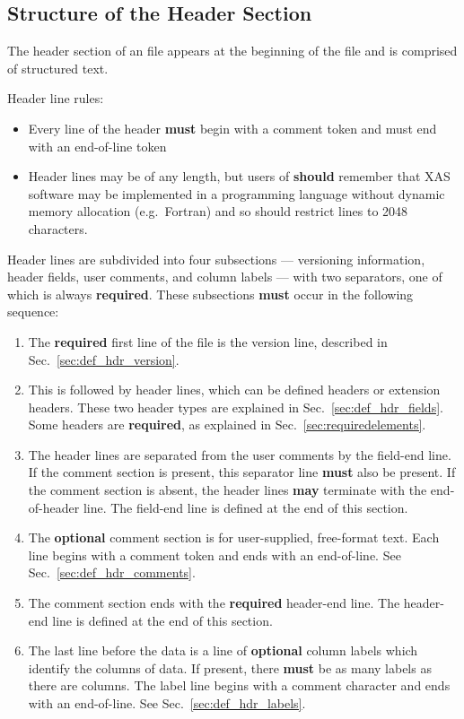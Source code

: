 \documentclass{article}
\begin{document}
\subsection{Structure of the Header Section}
\label{sec:def_hdr}


The header section of an {\xdi} file appears at the beginning of the
file and is comprised of structured text.

Header line rules:

\begin{itemize}
\item Every line of the header \textbf{must} begin with a comment
  token and must end with an end-of-line token
\item Header lines may be of any length, but users of {\xdi}
  \textbf{should} remember that XAS software may be implemented in a
  programming language without dynamic memory allocation
  (e.g.\ Fortran) and so should restrict lines to 2048 characters.
\end{itemize}

Header lines are subdivided into four subsections --- versioning
information, header fields, user comments, and column labels --- with
two separators, one of which is always \textbf{required}.  These
subsections \textbf{must} occur in the following sequence:

\begin{enumerate}
\item The \textbf{required} first line of the file is the version
  line, described in Sec.~\ref{sec:def_hdr_version}.
\item This is followed by header lines, which can be defined headers
  or extension headers. These two header types are explained in
  Sec.~\ref{sec:def_hdr_fields}.  Some headers are \textbf{required},
  as explained in Sec.~\ref{sec:requiredelements}.
\item The header lines are separated from the user comments by the
  field-end line.  If the comment section is present, this separator
  line \textbf{must} also be present. If the comment section is
  absent, the header lines \textbf{may} terminate with the
  end-of-header line. The field-end line is defined at the end of this
  section.
\item The \textbf{optional} comment section is for user-supplied,
  free-format text.  Each line begins with a comment token and ends
  with an end-of-line.  See Sec.~\ref{sec:def_hdr_comments}.
\item The comment section ends with the \textbf{required} header-end
  line.  The header-end line is defined at the end of this section.
\item The last line before the data is a line of \textbf{optional}
  column labels which identify the columns of data.  If present, there
  \textbf{must} be as many labels as there are columns. The label line
  begins with a comment character and ends with an end-of-line. See
  Sec.~\ref{sec:def_hdr_labels}.
\end{enumerate}
\end{document}
